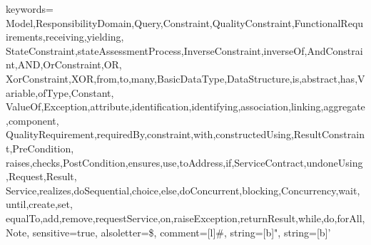 \usepackage{color}
\usepackage{listings}
{
keywords=
  {Model,ResponsibilityDomain,Query,Constraint,QualityConstraint,FunctionalRequirements,receiving,yielding,
  StateConstraint,stateAssessmentProcess,InverseConstraint,inverseOf,AndConstraint,AND,OrConstraint,OR,
  XorConstraint,XOR,from,to,many,BasicDataType,DataStructure,is,abstract,has,Variable,ofType,Constant,
  ValueOf,Exception,attribute,identification,identifying,association,linking,aggregate,component,
  QualityRequirement,requiredBy,constraint,with,constructedUsing,ResultConstraint,PreCondition,
  raises,checks,PostCondition,ensures,use,toAddress,if,ServiceContract,undoneUsing,Request,Result,
  Service,realizes,doSequential,choice,else,doConcurrent,blocking,Concurrency,wait,until,create,set,
  equalTo,add,remove,requestService,on,raiseException,returnResult,while,do,forAll,Note},%
sensitive=true,%
alsoletter={\$},%
comment=[l]{\#},%
string=[b]",%
string=[b]'%
}

